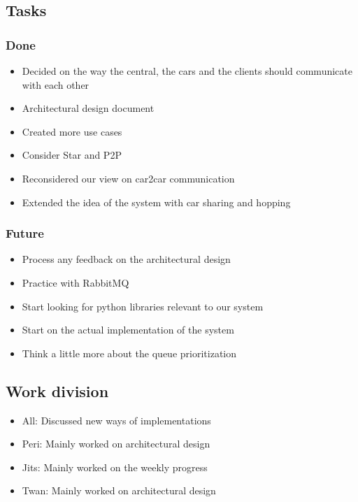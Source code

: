 \documentclass[a4paper]{article}
\begin{document}
\subsection*{Tasks}
\subsubsection*{Done}
\begin{itemize}
    \item Decided on the way the central, the cars and the clients should communicate with each other
    \item Architectural design document
    \item Created more use cases
    \item Consider Star and P2P
    \item Reconsidered our view on car2car communication
    \item Extended the idea of the system with car sharing and hopping
\end{itemize}

\subsubsection*{Future}
\begin{itemize}
    \item Process any feedback on the architectural design
    \item Practice with RabbitMQ
	\item Start looking for python libraries relevant to our system
    \item Start on the actual implementation of the system
    \item Think a little more about the queue prioritization 
\end{itemize}

\subsection*{Work division}
\begin{itemize}
	\item All: Discussed new ways of implementations 
    \item Peri: Mainly worked on architectural design
    \item Jits: Mainly worked on the weekly progress
    \item Twan: Mainly worked on architectural design
\end{itemize}
\end{document}
